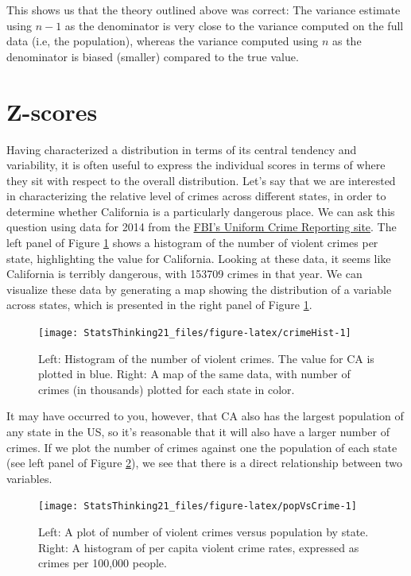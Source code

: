 \documentclass[12pt,]{book}
\theoremstyle{definition}
\theoremstyle{definition}
\theoremstyle{definition}
\theoremstyle{remark}
\begin{document}
This shows us that the theory outlined above was correct: The variance estimate using \(n - 1\) as the denominator is very close to the variance computed on the full data (i.e, the population), whereas the variance computed using \(n\) as the denominator is biased (smaller) compared to the true value.

\hypertarget{z-scores}{%
\section{Z-scores}\label{z-scores}}

Having characterized a distribution in terms of its central tendency and variability, it is often useful to express the individual scores in terms of where they sit with respect to the overall distribution. Let's say that we are interested in characterizing the relative level of crimes across different states, in order to determine whether California is a particularly dangerous place. We can ask this question using data for 2014 from the \href{https://www.ucrdatatool.gov/Search/Crime/State/RunCrimeOneYearofData.cfm}{FBI's Uniform Crime Reporting site}. The left panel of Figure \ref{fig:crimeHist} shows a histogram of the number of violent crimes per state, highlighting the value for California. Looking at these data, it seems like California is terribly dangerous, with 153709 crimes in that year. We can visualize these data by generating a map showing the distribution of a variable across states, which is presented in the right panel of Figure \ref{fig:crimeHist}.

\begin{figure}
\texttt{[image: StatsThinking21\_files/figure-latex/crimeHist-1]} \caption{Left: Histogram of the number of violent crimes.  The value for CA is plotted in blue. Right: A map of the same data, with number of crimes (in thousands) plotted for each state in color.}\label{fig:crimeHist}
\end{figure}

It may have occurred to you, however, that CA also has the largest population of any state in the US, so it's reasonable that it will also have a larger number of crimes. If we plot the number of crimes against one the population of each state (see left panel of Figure \ref{fig:popVsCrime}), we see that there is a direct relationship between two variables.

\begin{figure}
\texttt{[image: StatsThinking21\_files/figure-latex/popVsCrime-1]} \caption{Left: A plot of number of violent crimes versus population by state. Right: A histogram of per capita violent crime rates, expressed as crimes per 100,000 people.}\label{fig:popVsCrime}
\end{figure}
\end{document}
